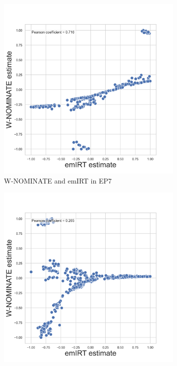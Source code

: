 \documentclass[a4paper,12pt]{report}
\begin{document}
    \begin{figure}[H]
        \centering
        \begin{subfigure}[b]{0.48\textwidth}
            \centering
            \includegraphics[width=\textwidth]{Graphs/ScatterWNOMINATE_7}
            \caption{W-NOMINATE and emIRT in EP7}
            \label{fig:WNOMINATE_SCATTER_7}
        \end{subfigure}
        \hfill
        \begin{subfigure}[b]{0.48\textwidth}
            \centering
            \includegraphics[width=\textwidth]{Graphs/ScatterWNOMINATE_8}

\end{subfigure}
\end{figure}
\end{document}
